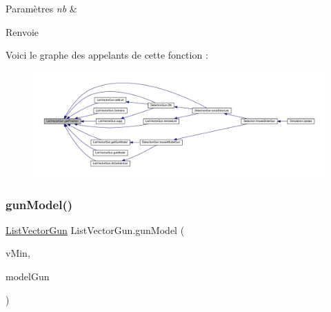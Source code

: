\begin{DoxyParams}{Paramètres}
{\em nb} & \\
\hline
\end{DoxyParams}
\begin{DoxyReturn}{Renvoie}

\end{DoxyReturn}
Voici le graphe des appelants de cette fonction \+:
\nopagebreak
\begin{figure}[H]
\begin{center}
\leavevmode
\includegraphics[width=350pt]{class_list_vector_gun_a6b94b7d8288d1415f1670181251bbfa2_icgraph}
\end{center}
\end{figure}
\mbox{\label{class_list_vector_gun_a1c5fc4ed92b846e08616d83971605241}} 
\subsubsection{\texorpdfstring{gun\+Model()}{gunModel()}}
{\footnotesize\ttfamily \mbox{\hyperlink{class_list_vector_gun}{List\+Vector\+Gun}} List\+Vector\+Gun.\+gun\+Model (\begin{DoxyParamCaption}\item[{Vector3}]{v\+Min,  }\item[{\mbox{\hyperlink{class_list_vector_gun}{List\+Vector\+Gun}}}]{model\+Gun }\end{DoxyParamCaption})\hspace{0.3cm}{\ttfamily [inline]}}






